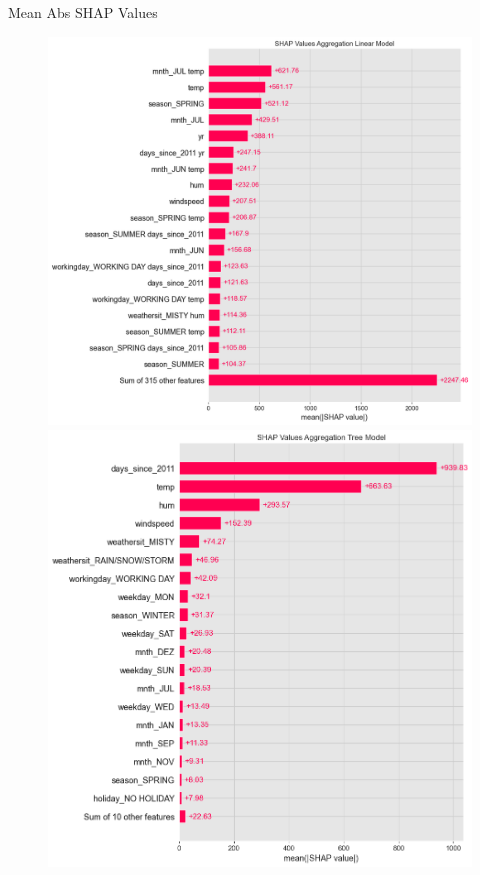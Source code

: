 \documentclass[10pt]{beamer}
\begin{document}
\begin{frame}{Mean Abs SHAP Values}
\begin{center}
  \begin{figure}
    \includegraphics[scale=0.21]{images/interpretable_ml_116_0.png}
    \includegraphics[scale=0.21]{images/interpretable_ml_128_0.png}
  \end{figure}
\end{center}
\end{frame}
\end{document}
